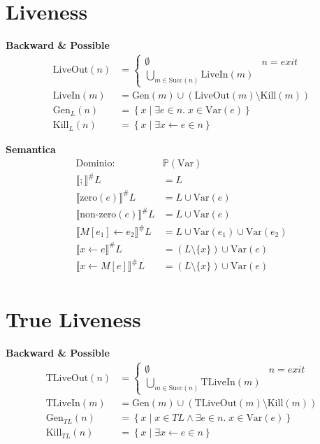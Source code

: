 \documentclass[a4paper,12pt,openany]{article}
\newcommand{\TL}{T\!L}
\begin{document}
    
    \section*{Liveness}
    \textbf{Backward \& Possible}
    \begin{align*}
    \mbox{LiveOut}(n) &=
    \begin{cases}
        \emptyset & n = exit\\
        \bigcup\limits_{m\in \mbox{Succ}(n)} \mbox{LiveIn}(m)
    \end{cases}\\
    \mbox{LiveIn}(m) &= \mbox{Gen}(m) \cup (\mbox{LiveOut}(m) \setminus \mbox{Kill}(m))\\
    \mbox{Gen}_{L}(n) &= \left\{
    x \;\big\vert\; \exists e \in n.\; x\in\mbox{Var}(e)
    \right\}\\
    \mbox{Kill}_{L}(n) &= \left\{
    x \;\big\vert\; \exists x\leftarrow e \in n
    \right\}
    \end{align*}
    
    \textbf{Semantica}
    \begin{align*}
    \mbox{Dominio: }& \mathbb{P}(\mbox{Var})\\
    \llbracket ; \rrbracket^\#L &= L\\
    \llbracket \mbox{zero}(e) \rrbracket^\#L &= L \cup \mbox{Var}(e)\\
    \llbracket \mbox{non-zero}(e) \rrbracket^\#L &= L \cup \mbox{Var}(e)\\
    \llbracket M[e_1]\leftarrow e_2 \rrbracket^\#L &= L \cup \mbox{Var}(e_1) \cup \mbox{Var}(e_2)\\
    \llbracket x \leftarrow e \rrbracket^\#L &= (L\setminus \{x\}) \cup \mbox{Var}(e)\\
    \llbracket x\leftarrow M[e] \rrbracket^\#L &= (L\setminus \{x\}) \cup \mbox{Var}(e)\\
    \end{align*}
    
    
    \section*{True Liveness}
    \textbf{Backward \& Possible}
    \begin{align*}
    \mbox{TLiveOut}(n) &=
    \begin{cases}
    \emptyset & n = exit\\
    \bigcup\limits_{m\in \mbox{Succ}(n)} \mbox{TLiveIn}(m)
    \end{cases}\\
    \mbox{TLiveIn}(m) &= \mbox{Gen}(m) \cup (\mbox{TLiveOut}(m) \setminus \mbox{Kill}(m))\\
    \mbox{Gen}_{\TL}(n) &= \left\{
    x \;\big\vert\; x \in \TL \land \exists e \in n.\; x\in\mbox{Var}(e)
    \right\}\\
    \mbox{Kill}_{\TL}(n) &= \left\{
    x \;\big\vert\; \exists x\leftarrow e \in n
    \right\}
    \end{align*}
    
\end{document}

